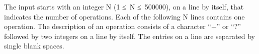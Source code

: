 The input starts with an integer N (1 ≤ N ≤ 500000), on a line by itself, that indicates the number of operations. Each of the following N lines contains one operation. The description of an operation consists of a character “+” or “?” followed by two integers on a line by itself. The entries on a line are separated by single blank spaces.   


\\
